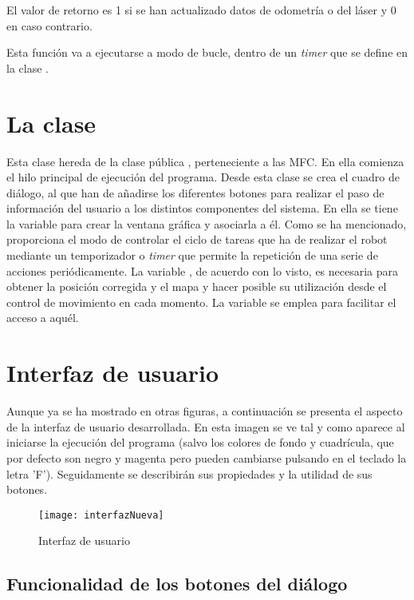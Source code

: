 El valor de retorno es 1 si se han actualizado datos de odometría o del láser y 0 en caso contrario.

Esta función va a ejecutarse a modo de bucle, dentro de un \emph{timer} que se define en la clase .

\section{La clase }
Esta clase hereda de la clase pública , perteneciente a las MFC. En ella comienza el hilo principal de ejecución del programa. Desde esta clase se crea el cuadro de diálogo, al que han de añadirse los diferentes botones para realizar el paso de información del usuario a los distintos componentes del sistema. En ella se tiene la variable  para crear la ventana gráfica y asociarla a él. Como se ha mencionado, proporciona el modo de controlar el ciclo de tareas que ha de realizar el robot mediante un temporizador o \emph{timer} que permite la repetición de una serie de acciones periódicamente. La variable , de acuerdo con lo visto, es necesaria para obtener la posición corregida y el mapa y hacer posible su utilización desde el control de movimiento en cada momento. La variable  se emplea para facilitar el acceso a aquél. %

\section{Interfaz de usuario}
Aunque ya se ha mostrado en otras figuras, a continuación se presenta el aspecto de la interfaz de usuario desarrollada. En esta imagen se ve tal y como aparece al iniciarse la ejecución del programa (salvo los colores de fondo y cuadrícula, que por defecto son negro y magenta pero pueden cambiarse pulsando en el teclado la letra 'F'). Seguidamente se describirán sus propiedades y la utilidad de sus botones.

\begin{figure}[h]
  \centering\texttt{[image: interfazNueva]}\\
  \caption{Interfaz de usuario}\label{fg:interfaz}
\end{figure}


\subsection{Funcionalidad de los botones del diálogo}

